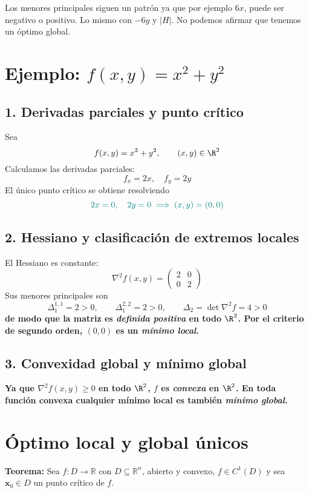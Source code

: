\documentclass{article}
\begin{document}
Los menores principales siguen un patrón ya que por ejemplo $6x$, puede ser negativo o positivo. Lo mismo con $-6y$ y $|H|$. No podemos afirmar que tenemos un óptimo global.


\section*{Ejemplo: \(f(x,y)=x^2+y^2\)}

\subsection*{1. Derivadas parciales y punto crítico}

Sea 
\[
f(x,y)=x^2+y^2,\qquad (x,y)\in\R^2
\]
Calculamos las derivadas parciales:
\[
f_x=2x,\quad f_y=2y
\]
El único punto crítico se obtiene resolviendo
\[ \color{teal}
2x=0,\quad 2y=0
\;\Longrightarrow\;
(x,y)=(0,0)
\]

\subsection*{2. Hessiano y clasificación de extremos locales}

El Hessiano es constante:
\[
\nabla^2 f(x,y)
=
\begin{pmatrix}
2 & 0\\[4pt]
0 & 2
\end{pmatrix}
\]
Sus menores principales son
\[
\Delta_1^{1,1}=2>0,\qquad \Delta_1^{2,2}=2>0,\qquad
\Delta_2=\det\nabla^2f=4>0
\]
\textbf{\color{teal}de modo que la matriz es \emph{definida positiva} en todo \(\R^2\). Por el criterio de segundo orden, \((0,0)\) es un \emph{mínimo local}.
}
\subsection*{3. Convexidad global y mínimo global}

\textbf{\color{teal}Ya que \(\nabla^2f(x,y) \geq0\) en todo \(\R^2\), \(f\) es \emph{convexa} en \(\R^2\). En toda función convexa cualquier mínimo local es también \emph{mínimo global}. }

\section*{Óptimo local y global únicos}

\textbf{Teorema:} Sea \( f : D \to \mathbb{R} \) con \( D \subseteq \mathbb{R}^n \), abierto y convexo, \( f \in C^1(D) \) y sea \( \mathbf{x}_0 \in D \) un punto crítico de \( f \).
\end{document}
